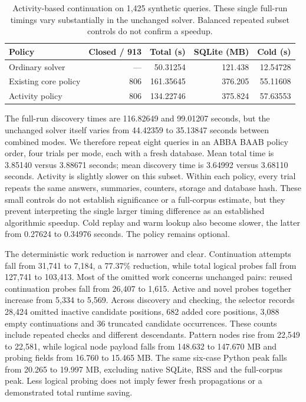 \documentclass[11pt,a4paper]{article}
\numberwithin{equation}{section}
\theoremstyle{plain}
\theoremstyle{definition}
\theoremstyle{remark}
\begin{document}
\begin{table}[htbp]
\centering
\small
\begin{tabular}{lrrrr}
\hline
Policy & Closed / 913 & Total (s) & SQLite (MB) & Cold (s) \\
\hline
Ordinary solver & --- & 50.31254 & 121.438 & 12.54728 \\
Existing core policy & 806 & 161.35645 & 376.205 & 55.11608 \\
Activity policy & 806 & 134.22746 & 375.824 & 57.63553 \\
\hline
\end{tabular}
\caption{Activity-based continuation on 1,425 synthetic queries. These single full-run timings vary substantially in the unchanged solver. Balanced repeated subset controls do not confirm a speedup.}
\label{tab:activity-continuation}
\end{table}

The full-run discovery times are 116.82649 and 99.01207 seconds, but the unchanged solver itself varies from 44.42359 to 35.13847 seconds between combined modes. We therefore repeat eight queries in an ABBA BAAB policy order, four trials per mode, each with a fresh database. Mean total time is 3.85140 versus 3.88671 seconds; mean discovery time is 3.64992 versus 3.68110 seconds. Activity is slightly slower on this subset. Within each policy, every trial repeats the same answers, summaries, counters, storage and database hash. These small controls do not establish significance or a full-corpus estimate, but they prevent interpreting the single larger timing difference as an established algorithmic speedup. Cold replay and warm lookup also become slower, the latter from 0.27624 to 0.34976 seconds. The policy remains optional.

The deterministic work reduction is narrower and clear. Continuation attempts fall from 31,741 to 7,184, a 77.37\% reduction, while total logical probes fall from 127,741 to 103,413. Most of the omitted work concerns unchanged pairs: reused continuation probes fall from 26,407 to 1,615. Active and novel probes together increase from 5,334 to 5,569. Across discovery and checking, the selector records 28,424 omitted inactive candidate positions, 682 added core positions, 3,088 empty continuations and 36 truncated candidate occurrences. These counts include repeated checks and different descendants. Pattern nodes rise from 22,549 to 22,581, while logical node payload falls from 148.632 to 147.670 MB and probing fields from 16.760 to 15.465 MB. The same six-case Python peak falls from 20.265 to 19.997 MB, excluding native SQLite, RSS and the full-corpus peak. Less logical probing does not imply fewer fresh propagations or a demonstrated total runtime saving.
\end{document}
